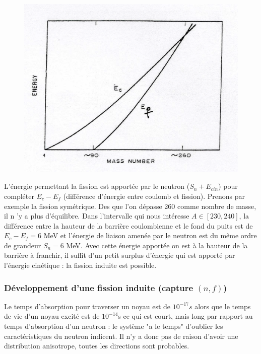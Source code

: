 	\begin{figure}
	\vspace{-5mm}
	\includegraphics[scale=0.25]{ch1/image11.png}
	\end{figure}
L'énergie permettant la fission est apportée par le neutron ($S_n+E_{cin}$) pour compléter 
$E_c-E_f$ (différence d'énergie entre coulomb et fission). Prenons par exemple la fission 
symétrique. Des que l'on dépasse 260 comme nombre de masse, il n 'y a plus d'équilibre. Dans 
l'intervalle qui nous intéresse $A\in[230,240]$, la différence entre la hauteur de la barrière 
coulombienne et le fond du puits est de $E_c-E_f=6$ MeV et l'énergie de liaison amenée par 
le neutron est du même ordre de grandeur $S_n = 6$ MeV. Avec cette énergie apportée on est à 
la hauteur de la barrière à franchir, il suffit d'un petit surplus d'énergie qui est apporté 
par l'énergie cinétique : la fission induite est possible.\\


\subsubsection{Développement d'une fission induite (capture $(n,f)$)}
Le temps d'absorption pour traverser un noyau est de $10^{-17}s$ alors que le temps de vie d'un 
noyau excité est de $10^{-14}$s ce qui est court, mais long par rapport au temps 
d'absorption d'un neutron : le système "a le temps" d'oublier les caractéristiques du neutron 
indicent. Il n'y a donc pas de raison d'avoir une distribution anisotrope, toutes les directions 
sont probables.\\

